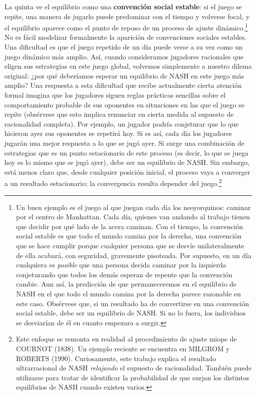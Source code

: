 \documentclass[10pt,a4paper]{article}
\begin{document}
La quinta ve el equilibrio como una \textbf{convención social estable}: si el juego se repite, una manera de jugarlo puede predominar con el tiempo y volverse focal, y el equilibrio aparece como el punto de reposo de un proceso de ajuste dinámico.\footnote{%
  Un buen ejemplo es el juego al que juegan cada día los neoyorquinos: caminar por el centro de Manhattan. Cada día, quienes van andando al trabajo tienen que decidir por qué lado de la acera caminan. Con el tiempo, la convención social estable es que todo el mundo camina por la derecha, una convención que se hace cumplir porque cualquier persona que se desvíe unilateralmente de ella acabará, con seguridad, gravemente pisoteada. Por supuesto, en un día cualquiera es \textit{posible} que una persona decida caminar por la izquierda conjeturando que todos los demás esperan de repente que la convención cambie. Aun así, la predicción de que permaneceremos en el equilibrio de NASH en el que todo el mundo camina por la derecha parece razonable en este caso. Obsérvese que, si un resultado ha de convertirse en una convención social estable, debe ser un equilibrio de NASH. Si no lo fuera, los individuos se desviarían de él en cuanto empezara a surgir.
} No es fácil modelizar formalmente la aparición de convenciones sociales estables. Una dificultad es que el juego repetido de un día puede verse a su vez como un juego dinámico más amplio. Así, cuando consideramos jugadores racionales que eligen sus estrategias en este juego global, volvemos simplemente a nuestro dilema original: ¿por qué deberíamos esperar un equilibrio de NASH en este juego más amplio? Una respuesta a esta dificultad que recibe actualmente cierta atención formal imagina que los jugadores siguen reglas prácticas sencillas sobre el comportamiento probable de sus oponentes en situaciones en las que el juego se repite (obsérvese que esto implica renunciar en cierta medida al supuesto de racionalidad completa). Por ejemplo, un jugador podría conjeturar que lo que hicieron ayer sus oponentes se repetirá hoy. Si es así, cada día los jugadores jugarán una mejor respuesta a lo que se jugó ayer. Si surge una combinación de estrategias que es un punto estacionario de este proceso (es decir, lo que se juega hoy es lo mismo que se jugó ayer), debe ser un equilibrio de NASH. Sin embargo, está menos claro que, desde cualquier posición inicial, el proceso vaya a converger a un resultado estacionario; la convergencia resulta depender del juego.\footnote{%
    Este enfoque se remonta en realidad al procedimiento de ajuste miope de COURNOT (1838). Un ejemplo reciente se encuentra en MILGROM y ROBERTS (1990). Curiosamente, este trabajo explica el resultado ultrarracional de NASH \textit{relajando} el supuesto de racionalidad. También puede utilizarse para tratar de identificar la probabilidad de que surjan los distintos equilibrios de NASH cuando existen varios.
}
\end{document}
